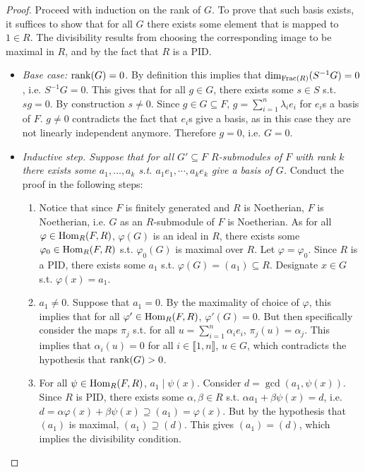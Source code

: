 \documentclass{article}
\begin{document}
\begin{proof}
    Proceed with induction on the rank of $G$. To prove that such basis exists, it suffices to show that for all $G$ there exists some element that is mapped to $1\in R$. The divisibility results from choosing the corresponding image to be maximal in $R$, and by the fact that $R$ is a PID. 
    \begin{itemize}
        \item \emph{Base case: $\mathrm{rank}(G) = 0$.} By definition this implies that $\dim_{\mathrm{Frac}(R)}(S^{-1}G) = 0$, i.e. $S^{-1}G = 0$. This gives that for all $g\in G$, there exists some $s\in S$ s.t. $sg = 0$. By construction $s\neq 0$. Since $g\in G \subseteq F$, $g = \sum_{i=1}^n \lambda_i e_i$ for $e_i$s a basis of $F$. $g\neq 0$ contradicts the fact that $e_i$s give a basis, as in this case they are not linearly independent anymore. Therefore $g = 0$, i.e. $G = 0$.
        \item \emph{Inductive step. Suppose that for all $G'\subseteq F$ $R$-submodules of $F$ with rank $k$ there exists some $a_1, \ldots, a_k$ s.t. $a_1e_1, \cdots, a_k e_k$ give a basis of $G$.} Conduct the proof in the following steps:
        \begin{enumerate}[label=\arabic*)]
            \item Notice that since $F$ is finitely generated and $R$ is Noetherian, $F$ is Noetherian, i.e. $G$ as an $R$-submodule of $F$ is Noetherian. As for all $\varphi \in \mathrm{Hom}_R(F, R)$, $\varphi(G)$ is an ideal in $R$, there exists some $\varphi_0 \in \mathrm{Hom}_R(F, R)$ s.t. $\varphi_0(G)$ is maximal over $R$. Let $\varphi = \varphi_0$. Since $R$ is a PID, there exists some $a_1$ s.t. $\varphi(G) = (a_1) \subseteq R$. Designate $x\in G$ s.t. $\varphi(x) = a_1$.
            \item $a_1 \neq 0$. Suppose that $a_1 = 0$. By the maximality of choice of $\varphi$, this implies that for all $\varphi' \in \mathrm{Hom}_R(F, R)$, $\varphi'(G) = 0$. But then specifically consider the maps $\pi_j$ s.t. for all $u = \sum_{i=1}^n \alpha_i e_i$, $\pi_j(u) = \alpha_j$. This implies that $\alpha_i(u) = 0$ for all $i\in\llbracket 1, n \rrbracket$, $u\in G$, which contradicts the hypothesis that $\mathrm{rank}(G) > 0$.
            \item For all $\psi \in \mathrm{Hom}_R(F, R)$, $a_1 \mid \psi(x)$. Consider $d = \gcd(a_1, \psi(x))$. Since $R$ is PID, there exists some $\alpha, \beta \in R$ s.t. $\alpha a_1 + \beta \psi(x) = d$, i.e. $d = \alpha \varphi(x) + \beta \psi(x) \supseteq (a_1) = \varphi(x)$. But by the hypothesis that $(a_1)$ is maximal, $(a_1) \supseteq (d)$. This gives $(a_1) = (d)$, which implies the divisibility condition.

\end{enumerate}
\end{itemize}
\end{proof}
\end{document}
